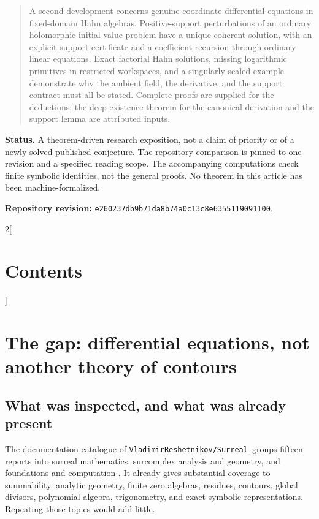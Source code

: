 \documentclass[11pt,letterpaper]{article}
\numberwithin{equation}{section}
\theoremstyle{definition}
\theoremstyle{remark}
\newcommand{\repo}{\texttt{VladimirReshetnikov/Surreal}}
\newcommand{\revision}{\texttt{e260237db9b71da8b74a0c13c8e6355119091100}}
\begin{document}
\begin{titlepage}
\begin{minipage}{0.96\textwidth}
\begin{abstract}
A second development concerns genuine coordinate differential equations in fixed-domain Hahn algebras. Positive-support perturbations of an ordinary holomorphic initial-value problem have a unique coherent solution, with an explicit support certificate and a coefficient recursion through ordinary linear equations. Exact factorial Hahn solutions, missing logarithmic primitives in restricted workspaces, and a singularly scaled example demonstrate why the ambient field, the derivative, and the support contract must all be stated. Complete proofs are supplied for the deductions; the deep existence theorem for the canonical derivation and the support lemma are attributed inputs.
\end{abstract}
\end{minipage}
\vfill
\begin{minipage}{0.96\textwidth}\small
\textbf{Status.} A theorem-driven research exposition, not a claim of priority or of a newly solved published conjecture. The repository comparison is pinned to one revision and a specified reading scope. The accompanying computations check finite symbolic identities, not the general proofs. No theorem in this article has been machine-formalized.\par
\medskip
\textbf{Repository revision:} \revision.
\end{minipage}
\end{titlepage}
\setcounter{page}{2}
\begingroup
\footnotesize\setlength{\parskip}{0pt}\setlength{\columnsep}{22pt}
\begin{multicols}{2}[\section*{Contents}]
\makeatletter{}\makeatother
\end{multicols}
\endgroup
\clearpage

\section{The gap: differential equations, not another theory of contours}\label{sec:gap}

\subsection{What was inspected, and what was already present}
The documentation catalogue of \repo\ groups fifteen reports into surreal mathematics, surcomplex analysis and geometry, and foundations and computation \cite{RepoCatalogue}. It already gives substantial coverage to summability, analytic geometry, finite zero algebras, residues, contours, global divisors, polynomial algebra, trigonometry, and exact symbolic representations. Repeating those topics would add little.
\end{document}
